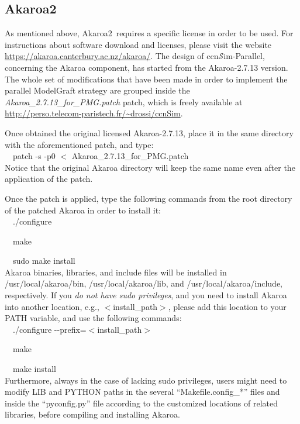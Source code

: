 \documentclass[10pt]{article}
\newcommand{\ccnsim}{ccn\ensuremath{\mathcal{S}}im} %
\newcommand{\akaroa}{Akaroa2\textcopyright\ }
\newcommand{\colorboxg}[1]{{\colorbox{gray!20}{#1}}}
\begin{document}
\subsection*{\akaroa}
As mentioned above, \akaroa requires a specific license in order to be used. 
For instructions about software download and licenses, please visit the website \url{https://akaroa.canterbury.ac.nz/akaroa/}.
The design of \ccnsim-Parallel, concerning the Akaroa component, has started from the Akaroa-2.7.13 version. 
The whole set of modifications that have been made in order to implement the parallel ModelGraft strategy are grouped inside the \emph{Akaroa\_2.7.13\_for\_PMG.patch} patch, which is freely available at \url{http://perso.telecom-paristech.fr/~drossi/ccnSim}.

Once obtained the original licensed Akaroa-2.7.13, place it in the same directory with the aforementioned patch, and type: \\

\ \ \colorboxg{patch -s -p0 $<$ Akaroa\_2.7.13\_for\_PMG.patch} \\

Notice that the original Akaroa directory will keep the same name even after the application of the patch.

Once the patch is applied, type the following commands from the root directory of the patched Akaroa in order to install it: \\

\ \ \colorboxg{./configure} 

\ \ \colorboxg{make} 

\ \ \colorboxg{sudo make install} \\

Akaroa binaries, libraries, and include files will be installed in /usr/local/akaroa/bin, /usr/local/akaroa/lib, and /usr/local/akaroa/include, respectively.
If you \emph{do not have sudo privileges}, and you need to install Akaroa into another location, e.g., $<$install\_path$>$, please add this location to your PATH variable, and use the following commands: \\

\ \ \colorboxg{./configure -{}-prefix=$<$install\_path$>$} 

\ \ \colorboxg{make} 

\ \ \colorboxg{make install} \\

Furthermore, always in the case of lacking sudo privileges, users might need to modify LIB and PYTHON paths in the several ``Makefile.config\_*'' files and inside the ``pyconfig.py'' file according to the customized locations of related libraries, before compiling and installing Akaroa.
\end{document}
